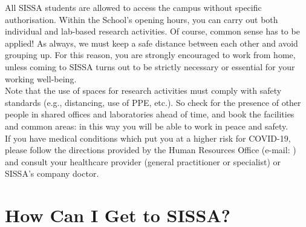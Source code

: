 \documentclass{sissavademecum}
\begin{document}
All SISSA students are allowed to access the campus without specific authorisation. Within the School's opening hours, you can carry out both individual and lab-based research activities. Of course, common sense has to be applied! As always, we must keep a safe distance between each other and avoid grouping up. For this reason, you are strongly encouraged to work from home, unless coming to SISSA turns out to be strictly necessary or essential for your working well-being. \\
Note that the use of spaces for research activities must comply with safety standards (e.g., distancing, use of PPE, etc.). So check for the presence of other people in shared offices and laboratories ahead of time, and book the facilities and common areas: in this way you will be able to work in peace and safety. \\
If you have medical conditions which put you at a higher risk for COVID-19, please follow the directions provided by the Human Resources Office (e-mail: ) and consult your healthcare provider (general practitioner or specialist) or SISSA's company doctor.


\section{How Can I Get to SISSA?}
\end{document}
